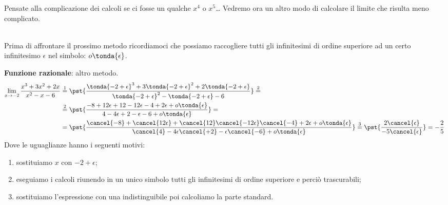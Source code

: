 \begin{osservazione}
Pensate alla complicazione dei calcoli se ci fosse un qualche \(x^4\) o
\(x^5\)\dots
Vedremo ora un altro modo di calcolare il limite che risulta meno 
complicato.
\end{osservazione}\\

Prima di affrontare il prossimo metodo ricordiamoci che possiamo 
raccogliere tutti gli infinitesimi di ordine superiore ad un certo 
infinitesimo \(\epsilon\) nel simbolo: \(o\tonda{\epsilon}\).

\begin{esempio}
\textbf{Funzione razionale}: altro metodo.
\begin{align*}
\lim_{x \rightarrow -2} \frac{x^3+3x^2+2x}{x^2-x-6} & \stackrel{1}{=} 
\pst{\frac
  {\tonda{-2+\epsilon}^3+3\tonda{-2+\epsilon}^2+2\tonda{-2+\epsilon}}
  {\tonda{-2+\epsilon}^2-\tonda{-2+\epsilon}-6}} \stackrel{2}{=}\\ 
  &\stackrel{2}{=}\pst{\frac{-8+12\epsilon+12-12\epsilon-4+2\epsilon+
                             o\tonda{\epsilon}}
                           {4-4\epsilon+2-\epsilon-6+o\tonda{\epsilon}
                           }}=\\ 
  &=\pst{\frac{\cancel{-8}+\cancel{12\epsilon}+
               \cancel{12}\cancel{-12\epsilon}\cancel{-4}+2\epsilon+
               o\tonda{\epsilon}}
              {\cancel{4}-4\epsilon\cancel{+2}-\epsilon\cancel{-6}+
               o\tonda{\epsilon}}}\stackrel{3}{=}
    \pst{\frac{2\cancel{\epsilon}}{-5\cancel{\epsilon}}} = -\frac{2}{5}
\end{align*}
Dove le uguaglianze hanno i seguenti motivi:
\begin{enumerate} [nosep]
 \item sostituiamo \(x\) con \(-2+\epsilon\);
 \item eseguiamo i calcoli riunendo in un unico simbolo tutti gli 
infinitesimi di ordine superiore e perciò trascurabili;
 \item sostituiamo l'espressione con una indistinguibile poi calcoliamo la 
parte standard.
\end{enumerate}
\end{esempio}

